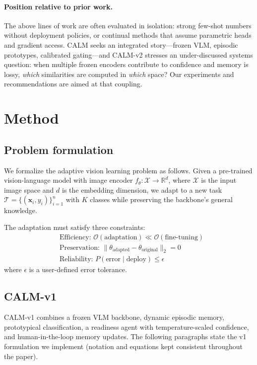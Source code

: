 \documentclass{article}
\begin{document}
\paragraph{Position relative to prior work.}
The above lines of work are often evaluated in isolation: strong few-shot numbers without deployment policies, or continual methods that assume parametric heads and gradient access. CALM seeks an integrated story---frozen VLM, episodic prototypes, calibrated gating---and CALM-v2 stresses an under-discussed systems question: when multiple frozen encoders contribute to confidence and memory is lossy, \emph{which} similarities are computed in \emph{which} space? Our experiments and recommendations are aimed at that coupling.

\section{Method}\label{sec:method}

\subsection{Problem formulation}
We formalize the adaptive vision learning problem as follows. Given a pre-trained vision-language model with image encoder $f_\theta: \mathcal{X} \rightarrow \mathbb{R}^d$, where $\mathcal{X}$ is the input image space and $d$ is the embedding dimension, we adapt to a new task $\mathcal{T} = \{(\mathbf{x}_i, y_i)\}_{i=1}^{n}$ with $K$ classes while preserving the backbone's general knowledge.

The adaptation must satisfy three constraints:
\begin{align}
&\text{Efficiency: } \mathcal{O}(\text{adaptation}) \ll \mathcal{O}(\text{fine-tuning}) \label{eq:efficiency}\\
&\text{Preservation: } \|\theta_{\text{adapted}} - \theta_{\text{original}}\|_2 = 0 \label{eq:preservation}\\
&\text{Reliability: } P(\text{error}\mid\text{deploy}) \leq \epsilon \label{eq:reliability}
\end{align}
where $\epsilon$ is a user-defined error tolerance.

\subsection{CALM-v1}
CALM-v1 combines a frozen VLM backbone, dynamic episodic memory, prototypical classification, a readiness agent with temperature-scaled confidence, and human-in-the-loop memory updates. The following paragraphs state the v1 formulation we implement (notation and equations kept consistent throughout the paper).
\end{document}
